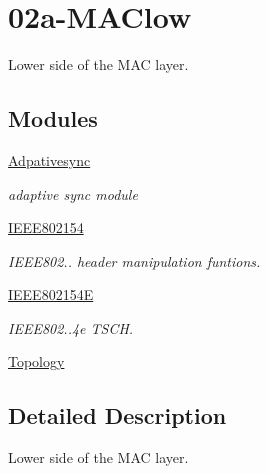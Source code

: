 \hypertarget{group___m_a_clow}{}\section{02a-\/\+M\+A\+Clow}
\label{group___m_a_clow}


Lower side of the M\+AC layer.  


\subsection*{Modules}
\begin{DoxyCompactItemize}
\item 
\hyperlink{group__adpativesync}{Adpativesync}
\begin{DoxyCompactList}\small\item\em adaptive sync module \end{DoxyCompactList}\item 
\hyperlink{group___i_e_e_e802154}{I\+E\+E\+E802154}
\begin{DoxyCompactList}\small\item\em I\+E\+E\+E802.. header manipulation funtions. \end{DoxyCompactList}\item 
\hyperlink{group___i_e_e_e802154_e}{I\+E\+E\+E802154E}
\begin{DoxyCompactList}\small\item\em I\+E\+E\+E802..\+4e T\+S\+CH. \end{DoxyCompactList}\item 
\hyperlink{group__topology}{Topology}
\end{DoxyCompactItemize}


\subsection{Detailed Description}
Lower side of the M\+AC layer. 

